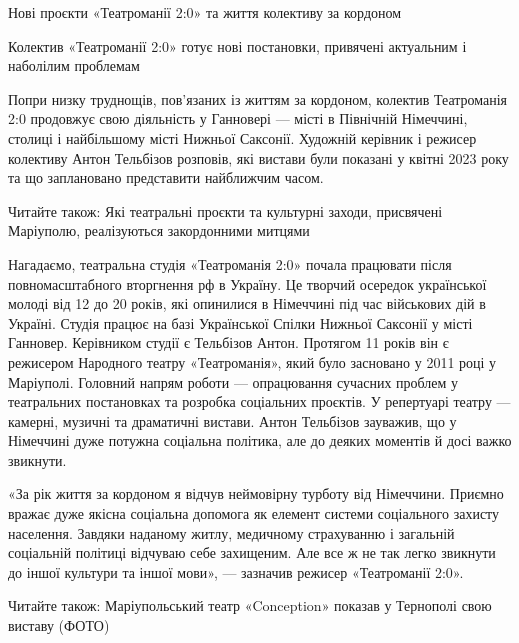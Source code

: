  
 
 
 
 

Нові проєкти «Театроманії 2:0» та життя колективу за кордоном

Колектив «Театроманії 2:0» готує нові постановки, привячені актуальним і
наболілим проблемам

Попри низку труднощів, пов’язаних із життям за кордоном, колектив Театроманія
2:0 продовжує свою діяльність у Ганновері — місті в Північній Німеччині,
столиці і найбільшому місті Нижньої Саксонії. Художній керівник і режисер
колективу Антон Тельбізов розповів, які вистави були показані у квітні 2023
року та що заплановано представити найближчим часом.

Читайте також: Які театральні проєкти та культурні заходи, присвячені
Маріуполю, реалізуються закордонними митцями

Нагадаємо, театральна студія «Театроманія 2:0» почала працювати після
повномасштабного вторгнення рф в Україну. Це творчий осередок української
молоді від 12 до 20 років, які опинилися в Німеччині під час військових дій в
Україні. Студія працює на базі Української Спілки Нижньої Саксонії у місті
Ганновер. Керівником студії є Тельбізов Антон. Протягом 11 років він є
режисером Народного театру «Театроманія», який було засновано у 2011 році у
Маріуполі. Головний напрям роботи — опрацювання сучасних проблем у театральних
постановках та розробка соціальних проєктів. У репертуарі театру — камерні,
музичні та драматичні вистави. Антон Тельбізов зауважив, що у Німеччині дуже
потужна соціальна політика, але до деяких моментів й досі важко звикнути. 

«За рік життя за кордоном я відчув неймовірну турботу від Німеччини. Приємно
вражає дуже якісна соціальна допомога як елемент системи соціального захисту
населення. Завдяки наданому житлу, медичному страхуванню і загальній соціальній
політиці відчуваю себе захищеним. Але все ж не так легко звикнути до іншої
культури та іншої мови», — зазначив режисер «Театроманії 2:0».

Читайте також: Маріупольський театр «Conception» показав у Тернополі свою
виставу (ФОТО)


